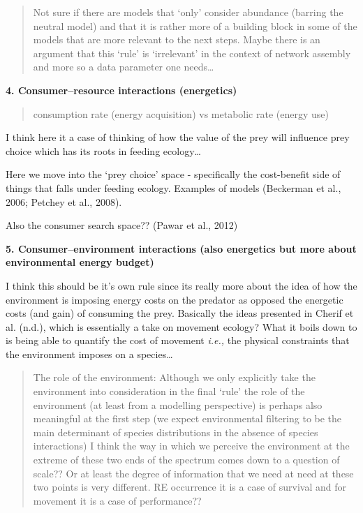 \documentclass[
]{article}
\begin{document}
\begin{tcolorbox}
\begin{quote}
Not sure if there are models that `only' consider abundance (barring the
neutral model) and that it is rather more of a building block in some of
the models that are more relevant to the next steps. Maybe there is an
argument that this `rule' is `irrelevant' in the context of network
assembly and more so a data parameter one needs\ldots{}
\end{quote}

\textbf{4. Consumer--resource interactions (energetics)}

\begin{quote}
consumption rate (energy acquisition) vs metabolic rate (energy use)
\end{quote}

I think here it a case of thinking of how the value of the prey will
influence prey choice which has its roots in feeding ecology\ldots{}

Here we move into the `prey choice' space - specifically the
cost-benefit side of things that falls under feeding ecology. Examples
of models (Beckerman et al., 2006; Petchey et al., 2008).

Also the consumer search space?? (Pawar et al., 2012)

\textbf{5. Consumer--environment interactions (also energetics but more
about environmental energy budget)}

I think this should be it's own rule since its really more about the
idea of how the environment is imposing energy costs on the predator as
opposed the energetic costs (and gain) of consuming the prey. Basically
the ideas presented in Cherif et al. (n.d.), which is essentially a take
on movement ecology? What it boils down to is being able to quantify the
cost of movement \emph{i.e.,} the physical constraints that the
environment imposes on a species\ldots{}

\begin{quote}
The role of the environment: Although we only explicitly take the
environment into consideration in the final `rule' the role of the
environment (at least from a modelling perspective) is perhaps also
meaningful at the first step (we expect environmental filtering to be
the main determinant of species distributions in the absence of species
interactions) I think the way in which we perceive the environment at
the extreme of these two ends of the spectrum comes down to a question
of scale?? Or at least the degree of information that we need at need at
these two points is very different. RE occurrence it is a case of
survival and for movement it is a case of performance??
\end{quote}


\end{tcolorbox}
\end{document}
